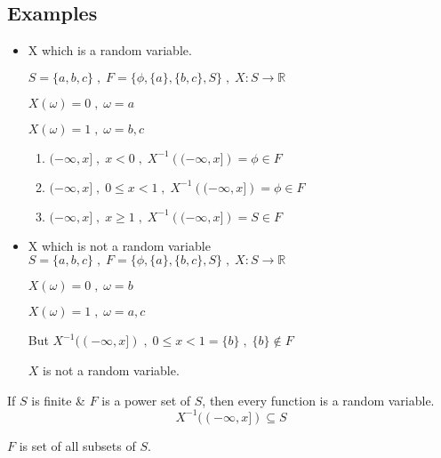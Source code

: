 \documentclass{article}
\begin{document}
\subsection{Examples}
\begin{itemize}
    \item X which is a random variable.

    $S= \{a,b,c\}\; ,\; F=\{ \phi, \{ a\}, \{b,c \}, S\}\; , \; X:S \rightarrow \mathbb{R}$

    $X(\omega) =0\; ,\; \omega =a $

    $X(\omega)= 1\;,\; \omega = b,c$
    \begin{enumerate}
        \item $( -\infty,x]\;,\; x < 0\;,\; X^{-1}\left( (-\infty , x]\right) = \phi \in F$
        \item $( -\infty,x]\;,\; 0 \leq x <1 \;,\; X^{-1}\left( (-\infty , x]\right) = \phi \in F$
        \item $( -\infty,x]\;,\; x \geq 1\;,\; X^{-1}\left( (-\infty , x]\right) = S \in F$
    \end{enumerate}

    \item X which is not a random variable
    $S= \{a,b,c\}\; ,\; F=\{ \phi, \{ a\}, \{b,c \}, S\}\; , \; X:S \rightarrow \mathbb{R}$

    $X(\omega) =0\; ,\; \omega =b $

    $X(\omega)= 1\;,\; \omega = a,c$

    But $X^{-1}((-\infty,x])\; , \;0\leq x<1 = \{b\} \; , \; \{ b\} \notin F$

    $X$ is not a random variable.
\end{itemize}

If $S$ is finite \& $F$ is a power set of $S$, then every function is a random variable.
$$ X^{-1}((-\infty,x]) \subseteq S$$

$F$ is set of all subsets of $S$.
\end{document}
